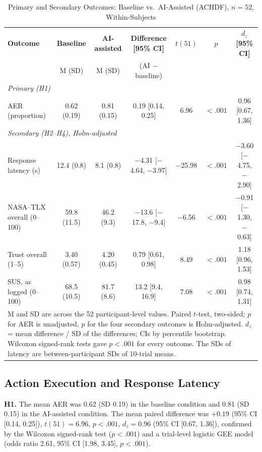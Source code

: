 \documentclass[journal]{IEEEtran}
\theoremstyle{plain}
\theoremstyle{definition}
\begin{document}
    \begin{table}[t]
        \caption{Primary and Secondary Outcomes: Baseline vs.\ AI-Assisted (ACHDF), $n=52$, Within-Subjects}
        \label{tab:primary}
        \centering
        \begin{tabular}{l c c c c c c}
            \toprule
            \textbf{Outcome} & \textbf{Baseline} & \textbf{AI-assisted} & \textbf{Difference [95\% CI]} & \textbf{$t(51)$} & \textbf{$p$} & \textbf{$d_z$ [95\% CI]} \\
            & M (SD) & M (SD) & (AI $-$ baseline) & & & \\
            \midrule
            \multicolumn{7}{l}{\emph{Primary (H1)}} \\
            AER (proportion) & 0.62 (0.19) & 0.81 (0.15) & 0.19 [0.14, 0.25] & 6.96 & $<.001$ & 0.96 [0.67, 1.36] \\
            \midrule
            \multicolumn{7}{l}{\emph{Secondary (H2--H4), Holm-adjusted}} \\
            Response latency (s) & 12.4 (0.8) & 8.1 (0.8) & $-$4.31 [$-$4.64, $-$3.97] & $-$25.98 & $<.001$ & $-$3.60 [$-$4.75, $-$2.90] \\
            NASA--TLX overall (0--100) & 59.8 (11.5) & 46.2 (9.3) & $-$13.6 [$-$17.8, $-$9.4] & $-$6.56 & $<.001$ & $-$0.91 [$-$1.30, $-$0.63] \\
            Trust overall (1--5) & 3.40 (0.57) & 4.20 (0.45) & 0.79 [0.61, 0.98] & 8.49 & $<.001$ & 1.18 [0.96, 1.53] \\
            SUS, as logged (0--100) & 68.5 (10.5) & 81.7 (8.6) & 13.2 [9.4, 16.9] & 7.08 & $<.001$ & 0.98 [0.74, 1.31] \\
            \bottomrule
            \multicolumn{7}{p{0.95\linewidth}}{\footnotesize M and SD are across the 52 participant-level values. Paired $t$-test, two-sided; $p$ for AER is unadjusted, $p$ for the four secondary outcomes is Holm-adjusted. $d_z$ = mean difference / SD of the differences; CIs by percentile bootstrap. Wilcoxon signed-rank tests gave $p<.001$ for every outcome. The SDs of latency are between-participant SDs of 10-trial means.}
        \end{tabular}
    \end{table}

    \subsection{Action Execution and Response Latency}
    \label{sec:res_aer}
    \textbf{H1.} The mean AER was 0.62 (SD 0.19) in the baseline condition and 0.81 (SD 0.15) in the AI-assisted condition. The mean paired difference was $+0.19$ (95\% CI [0.14, 0.25]), $t(51)=6.96$, $p<.001$, $d_z=0.96$ (95\% CI [0.67, 1.36]), confirmed by the Wilcoxon signed-rank test ($p<.001$) and a trial-level logistic GEE model (odds ratio 2.61, 95\% CI [1.98, 3.45], $p<.001$).
\end{document}
